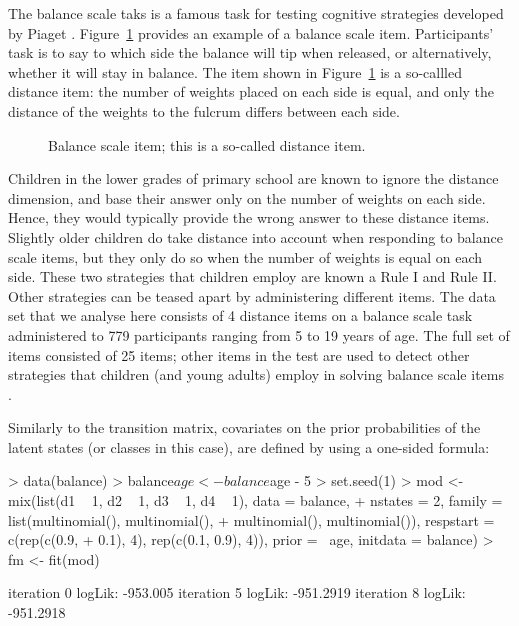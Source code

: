 \documentclass[article]{jss}
\begin{document}
The balance scale taks is a famous task for testing cognitive
strategies developed by Piaget \citep{Siegler1981}.
Figure~\ref{fig:balance} provides an example of a balance scale item.
Participants' task is to say to which side the balance will tip when
released, or alternatively, whether it will stay in balance.  The item
shown in Figure~\ref{fig:balance} is a so-callled distance item: the
number of weights placed on each side is equal, and only the distance
of the weights to the fulcrum differs between each side.

\begin{figure}[htbp]
\begin{center}
	\caption{Balance scale item; this is a so-called distance item.}
	\label{fig:balance}  
\end{center}
\end{figure}

Children in the lower grades of primary school are known to ignore the
distance dimension, and base their answer only on the number of
weights on each side.  Hence, they would typically provide the wrong
answer to these distance items.  Slightly older children do take
distance into account when responding to balance scale items, but they
only do so when the number of weights is equal on each side.  These
two strategies that children employ are known a Rule I and Rule II.
Other strategies can be teased apart by administering different items.
The  data set that we analyse here consists of 4
distance items on a balance scale task administered to 779
participants ranging from 5 to 19 years of age.  The full set of items
consisted of 25 items; other items in the test are used to detect
other strategies that children (and young adults) employ in solving
balance scale items \citep[see][for details]{Jansen2002}. 

Similarly to the transition matrix, covariates on the prior
probabilities of the latent states (or classes in this case), are
defined by using a one-sided formula:
\begin{Schunk}
\begin{Sinput}
> data(balance)
> balance$age <- balance$age - 5
> set.seed(1)
> mod <- mix(list(d1 ~ 1, d2 ~ 1, d3 ~ 1, d4 ~ 1), data = balance, 
+     nstates = 2, family = list(multinomial(), multinomial(), 
+         multinomial(), multinomial()), respstart = c(rep(c(0.9, 
+         0.1), 4), rep(c(0.1, 0.9), 4)), prior = ~age, initdata = balance)
> fm <- fit(mod)
\end{Sinput}
\begin{Soutput}
iteration 0 logLik: -953.005 
iteration 5 logLik: -951.2919 
iteration 8 logLik: -951.2918 
\end{Soutput}
\end{Schunk}
\end{document}
